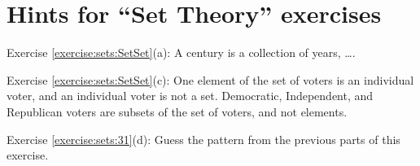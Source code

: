 \section{Hints for ``Set Theory'' exercises}\label{sec:set_chapter:hints}

\noindent Exercise \ref{exercise:sets:SetSet}(a): A century is a collection of years, \ldots.

\noindent Exercise \ref{exercise:sets:SetSet}(c): One element of the set of voters is an individual voter, and an individual voter is not a set. Democratic, Independent, and Republican voters are subsets of the set of voters, and not elements.

\noindent Exercise \ref{exercise:sets:31}(d): Guess the pattern from the previous parts of this exercise.
